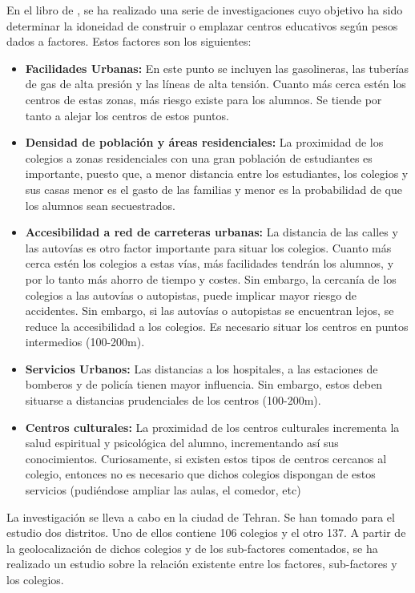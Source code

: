 En el libro de , se ha realizado una serie de investigaciones cuyo objetivo ha sido determinar la idoneidad de construir o emplazar centros educativos según pesos dados a factores. Estos factores son los siguientes:

\begin{itemize}
	\item \textbf{Facilidades Urbanas:} En este punto se incluyen las gasolineras, las tuberías de gas de alta presión y las líneas de alta tensión. Cuanto más cerca estén los centros de estas zonas, más riesgo existe para los alumnos. Se tiende por tanto a alejar los centros de estos puntos.
	\item \textbf{Densidad de población y áreas residenciales:} La proximidad de los colegios a zonas residenciales con una gran población de estudiantes es importante, puesto que, a menor distancia entre los estudiantes, los colegios y sus casas menor es el gasto de las familias y menor es la probabilidad de que los alumnos sean secuestrados.
	\item\textbf{ Accesibilidad a red de carreteras urbanas:} La distancia de las calles y las autovías es otro factor importante para situar los colegios. Cuanto más cerca estén los colegios a estas vías, más facilidades tendrán los alumnos, y por lo tanto más ahorro de tiempo y costes.
	Sin embargo, la cercanía de los colegios a las autovías o autopistas, puede implicar mayor riesgo de accidentes. Sin embargo, si las autovías o autopistas se encuentran lejos, se reduce la accesibilidad a los colegios. Es necesario situar los centros en puntos intermedios (100-200m).
	\item \textbf{Servicios Urbanos:} Las distancias a los hospitales, a las estaciones de bomberos y de policía tienen mayor influencia. Sin embargo, estos deben situarse a distancias prudenciales de los centros (100-200m).
	\item \textbf{Centros culturales:} La proximidad de los centros culturales incrementa la salud espiritual y psicológica del alumno, incrementando así sus conocimientos. Curiosamente, si existen estos tipos de centros cercanos al colegio, entonces no es necesario que dichos colegios dispongan de estos servicios (pudiéndose ampliar las aulas, el comedor, etc)
\end{itemize}                     

La investigación se lleva a cabo en la ciudad de Tehran. Se han tomado para el estudio dos distritos. Uno de ellos contiene 106 colegios y el otro 137. A partir de la geolocalización de dichos colegios y de los sub-factores comentados, se ha realizado un estudio sobre la relación existente entre los factores, sub-factores y los colegios.

